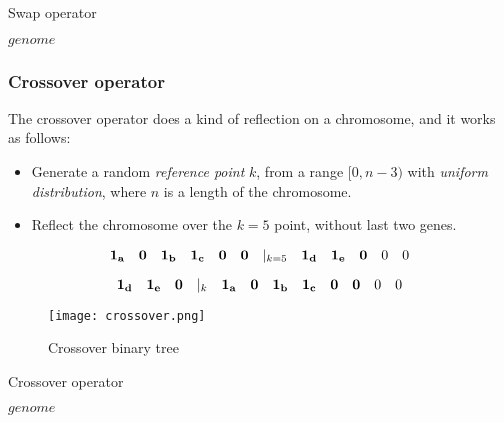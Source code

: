 \documentclass[12pt]{article}
\newlength\singleindent
\newcommand\bindent{%
  \begingroup
  \setlength{\itemindent}{\singleindent}
  \addtolength{\algorithmicindent}{\singleindent}
}
\newcommand\eindent{\endgroup}
\begin{document}
\begin{algorithm}
\scriptsize
\caption{Swap operator}
\begin{algorithmic}[]
    \bindent
        \RETURN $genome$
    \eindent
\end{algorithmic}
\end{algorithm}


\subsubsection{Crossover operator}

The crossover operator does a kind of reflection on a chromosome, and it works as follows:
\begin{itemize}
\item Generate a random \textit{reference point} $k$, from a range $[0, n-3)$ with \textit{uniform distribution}, where $n$ is a length of the chromosome.
\item Reflect the chromosome over the $k=5$ point, without last two genes.
\end{itemize}

\[
    {\bf1_a\quad 0\quad 1_b\quad 1_c\quad 0\quad 0}\quad|_{k=5}\quad {\bf1_d\quad 1_e\quad 0}\quad 0\quad 0
\]

\[
    {\bf1_d\quad 1_e\quad 0} \quad |_k \quad {\bf 1_a\quad0\quad 1_b\quad 1_c\quad 0\quad 0}\quad 0\quad 0
\]

\begin{figure}[ht]
\centering
\texttt{[image: crossover.png]}
\caption{Crossover binary tree}
\label{fig:crossover}
\end{figure}

\begin{algorithm}
\scriptsize
\caption{Crossover operator}
\begin{algorithmic}[]
    \bindent


        \RETURN $genome$
    \eindent
\end{algorithmic}
\end{algorithm}
\end{document}
